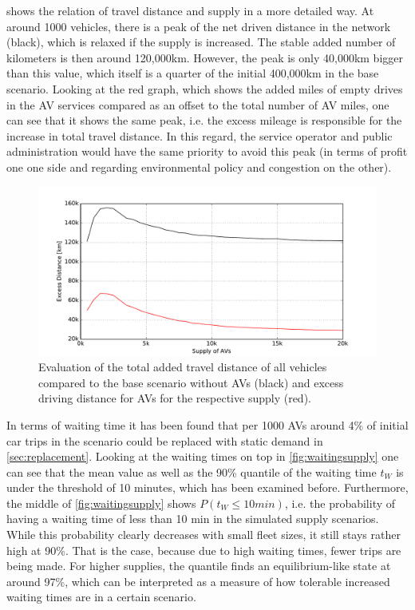  shows the relation of travel distance and supply in
a more detailed way. At around 1000 vehicles, there is a peak of the net driven
distance in the network (black), which is relaxed if the supply is increased. The
stable added number of kilometers is then around 120,000km. However, the peak is
only 40,000km bigger than this value, which itself is a quarter of the initial
400,000km in the base scenario. Looking at the red graph, which shows the added
miles of empty drives in the AV services compared as an offset to the total number
of AV miles, one can see that it shows the same peak, i.e. the excess mileage is
responsible for the increase in total travel distance. In this regard, the service
operator and public administration would have the same priority to avoid this peak
(in terms of profit one one side and regarding environmental policy and congestion on the other).

\begin{figure}
    \centering
    \includegraphics[width=1.0\textwidth]{figures/excessdistance.pdf}
    \caption{Evaluation of the total added travel distance of all vehicles compared
    to the base scenario without AVs (black) and excess driving distance for AVs
    for the respective supply (red).}
    \label{fig:excessdistance}
\end{figure}

In terms of waiting time it has been found that per 1000 AVs around 4\% of
initial car trips in the scenario could be replaced with static demand in \cref{sec:replacement}.
Looking at the waiting times on top in \cref{fig:waitingsupply}
one can see that the mean value as well as the 90\% quantile of the waiting time
$t_W$ is under the threshold of 10 minutes, which has been examined before. Furthermore, the middle of
\cref{fig:waitingsupply} shows $P(t_W \leq 10 min)$, i.e. the probability of having
a waiting time of less than 10 min in the simulated supply scenarios. While this
probability clearly decreases with small fleet sizes, it still stays rather high
at 90\%. That is the case, because due to high waiting times, fewer trips are being
made. For higher supplies, the quantile finds an equilibrium-like state at around
97\%, which can be interpreted as a measure of how tolerable increased waiting times are
in a certain scenario.

